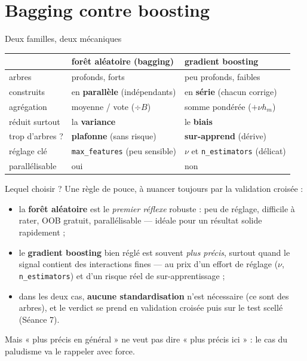 \documentclass[aspectratio=169,11pt]{beamer}
\begin{document}
\section{Bagging contre boosting}

\begin{frame}{Deux familles, deux mécaniques}
\begin{ucadret}
{\small \begin{center}\renewcommand{\arraystretch}{1.25}
\begin{tabular}{l|l|l}
 & \textbf{forêt aléatoire (bagging)} & \textbf{gradient boosting}\\\hline
arbres & profonds, forts & peu profonds, faibles\\
construits & en \textbf{parallèle} (indépendants) & en \textbf{série} (chacun corrige)\\
agrégation & moyenne / vote ($\div B$) & somme pondérée ($+ \nu h_m$)\\
réduit surtout & la \textbf{variance} & le \textbf{biais}\\
trop d'arbres ? & \textbf{plafonne} (sans risque) & \textbf{sur-apprend} (dérive)\\
réglage clé & \texttt{max\_features} (peu sensible) & $\nu$ et \texttt{n\_estimators} (délicat)\\
parallélisable & oui & non\\
\end{tabular}\end{center}}
\end{ucadret}
\end{frame}

\begin{frame}{Lequel choisir ?}
{\small Une règle de pouce, à nuancer toujours par la validation croisée :}
\begin{itemize}\small
  \item la \textbf{forêt aléatoire} est le \emph{premier réflexe} robuste : peu de réglage, difficile à rater, OOB gratuit, parallélisable — idéale pour un résultat solide rapidement ;
  \item le \textbf{gradient boosting} bien réglé est souvent \emph{plus précis}, surtout quand le signal contient des interactions fines — au prix d'un effort de réglage ($\nu$, \texttt{n\_estimators}) et d'un risque réel de sur-apprentissage ;
  \item dans les deux cas, \textbf{aucune standardisation} n'est nécessaire (ce sont des arbres), et le verdict se prend en validation croisée puis sur le test scellé (Séance 7).
\end{itemize}
{\small Mais « plus précis en général » ne veut pas dire « plus précis ici » : le cas du paludisme va le rappeler avec force.}
\end{frame}
\end{document}
